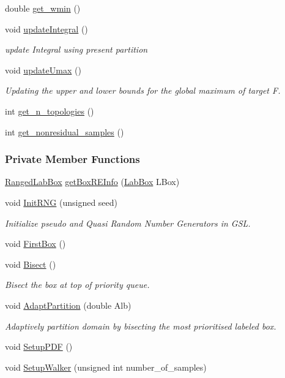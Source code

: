 \begin{DoxyCompactItemize}
double \hyperlink{classMRSampler_aa2d8b962208940151e182e6b3ccb3874}{get\-\_\-wmin} ()
\item 
void \hyperlink{classMRSampler_a973099a9a64b6e447b196e8fecc121da}{update\-Integral} ()
\begin{DoxyCompactList}\small\item\em update \-Integral using present partition \end{DoxyCompactList}\item 
void \hyperlink{classMRSampler_a7e98b9c2e972668a7df1b1b4853bef6e}{update\-Umax} ()
\begin{DoxyCompactList}\small\item\em \-Updating the upper and lower bounds for the global maximum of target \-F. \end{DoxyCompactList}\item 
int \hyperlink{classMRSampler_a0302488b026965e8e6c401037a0c9240}{get\-\_\-n\-\_\-topologies} ()
\item 
int \hyperlink{classMRSampler_ab5bb18ce86dcf3e6835084e12ad3caff}{get\-\_\-nonresidual\-\_\-samples} ()
\end{DoxyCompactItemize}
\subsubsection*{\-Private \-Member \-Functions}
\begin{DoxyCompactItemize}
\item 
\hyperlink{classRangedLabBox}{\-Ranged\-Lab\-Box} \hyperlink{classMRSampler_a727ae6c7bafcf46f34c320e902cf43fe}{get\-Box\-R\-E\-Info} (\hyperlink{classLabBox}{\-Lab\-Box} \-L\-Box)
\item 
void \hyperlink{classMRSampler_acea6f64c0aba88187122af49c5949ddc}{\-Init\-R\-N\-G} (unsigned seed)
\begin{DoxyCompactList}\small\item\em \-Initialize pseudo and \-Quasi \-Random \-Number \-Generators in \-G\-S\-L. \end{DoxyCompactList}\item 
void \hyperlink{classMRSampler_a0de2c0d6196f77662bb11304e3bec13d}{\-First\-Box} ()
\item 
void \hyperlink{classMRSampler_ae665da26800e35c295359e0d2dffb489}{\-Bisect} ()
\begin{DoxyCompactList}\small\item\em \-Bisect the box at top of priority queue. \end{DoxyCompactList}\item 
void \hyperlink{classMRSampler_a68198444d2875642e8ee2cb3f3120419}{\-Adapt\-Partition} (double \-Alb)
\begin{DoxyCompactList}\small\item\em \-Adaptively partition domain by bisecting the most prioritised labeled box. \end{DoxyCompactList}\item 
void \hyperlink{classMRSampler_a91a20bb1df74b36668d4ea206685246f}{\-Setup\-P\-D\-F} ()
\item 
void \hyperlink{classMRSampler_a4898e0225312caca6bdc53d034b8cd2a}{\-Setup\-Walker} (unsigned int number\-\_\-of\-\_\-samples)
\end{DoxyCompactItemize}
